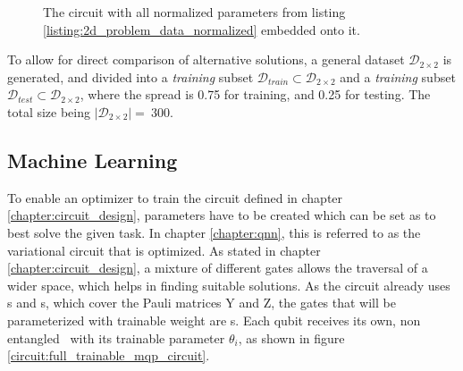 \begin{figure}[!h]
    \centering
    \caption{The circuit with all normalized parameters from listing \ref{listing:2d_problem_data_normalized} embedded onto it.}
    \label{circuit:example_mqo_solver_circuit_for_2d_problem_data}
\end{figure}

To allow for direct comparison of alternative solutions, a general dataset $\mathcal{D}_{2\times2}$ is generated, and divided into a \emph{training} subset $\mathcal{D}_{train} \subset \mathcal{D}_{2\times2}$ and a \emph{training} subset $\mathcal{D}_{test} \subset \mathcal{D}_{2\times2}$, where the spread is 0.75 for training, and 0.25 for testing. The total size being $\left|\mathcal{D}_{2\times2}\right| =\ 300$.


\subsection{Machine Learning}
\label{chapter:mqo_machine_learning}

To enable an optimizer to train the circuit defined in chapter \ref{chapter:circuit_design}, parameters have to be created which can be set as to best solve the given task. In chapter \ref{chapter:qnn}, this is referred to as the variational circuit that is optimized. As stated in chapter \ref{chapter:circuit_design}, a mixture of different gates allows the traversal of a wider space, which helps in finding suitable solutions. As the circuit already uses \rygate s and \crzgate s, which cover the Pauli matrices $\mathrm{Y}$ and $\mathrm{Z}$, the gates that will be parameterized with trainable weight are \rxgate s. Each qubit receives its own, non entangled \rxgate\ with its trainable parameter $\theta_i$, as shown in figure \ref{circuit:full_trainable_mqp_circuit}.

